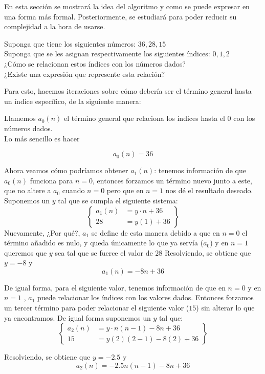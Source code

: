 
En esta sección se mostrará la idea del algoritmo y como se puede expresar en una forma más formal. Posteriormente, se estudiará para poder reducir su complejidad a la hora de usarse.

Suponga que tiene los siguientes números: $36, 28, 15$\\
Suponga que se les asignan respectivamente los siguientes índices: $0, 1, 2$\\
¿Cómo se relacionan estos índices con los números dados?\\
¿Existe una expresión que represente esta relación?

Para esto, hacemos iteraciones sobre cómo debería ser el término general hasta un índice específico, de la siguiente manera:

\vspace{10pt}
Llamemos $a_0(n)$ el término general que relaciona los índices hasta el $0$ con los números dados.\\
Lo más sencillo es hacer

\[a_0(n) = 36\]

Ahora veamos cómo podríamos obtener $a_1(n)$: tenemos información de que
$a_0(n)$ funciona para $n = 0$, entonces forzamos un término nuevo junto
a este, que no altere a $a_0$ cuando $n=0$ pero que en $n=1$ nos dé el
resultado deseado.
Suponemos un $y$ tal que se cumpla el siguiente sistema:
\begin{equation*}
    \left\{
        \begin{aligned}
            a_1(n) &= y\cdot n + 36\\
            28 &= y(1) + 36
        \end{aligned}
    \right\}
\end{equation*}
Nuevamente, ¿Por qué?, $a_1$ se define de esta manera debido a que en $n=0$ el término añadido es nulo, y queda únicamente lo que ya servía ($a_0$) y en $n=1$ queremos que $y$ sea tal que se fuerce el valor de $28$
Resolviendo, se obtiene que $y = -8$ y
\[a_1(n) = -8n + 36\]

De igual forma, para el siguiente valor, tenemos información de que en $n=0$ y en $n=1$ , $a_1$ puede relacionar los índices con los valores dados. Entonces forzamos un tercer término para poder relacionar el siguiente valor ($15$) sin alterar lo que ya encontramos. De igual forma suponemos un $y$ tal que:
\begin{equation*}
    \left\{
        \begin{aligned}
            a_2(n) &= y\cdot n(n-1) -8n + 36\\
            15 &= y (2)(2-1) - 8(2) + 36
        \end{aligned}
    \right\}
\end{equation*}

{\noindent Resolviendo, se obtiene que $y = -2.5$ y}
\[a_2(n) = -2.5n(n-1) - 8n + 36\]